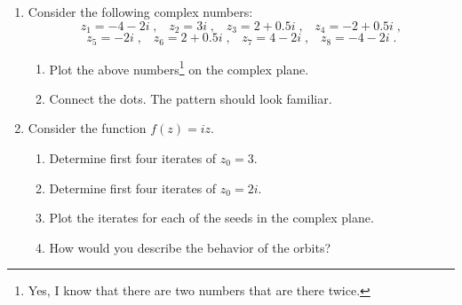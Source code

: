 \documentclass[12pt]{extarticle}
\begin{document}
\begin{enumerate}
\item Consider the following
  complex numbers:
  \begin{equation}
    z_1 = -4 -2i \;,\;\;\; z_2 = 3i \;,\;\;\; z_3 = 2 + 0.5i \;,
    \;\;\;   z_4 = -2 +0.5i \;,
  \end{equation}
  \begin{equation}
  z_5 = -2i \;,\;\;\; z_6 = 2 + 0.5i \;, \;\;\;    z_7 = 4 -2i
  \;,\;\;\; z_8 = -4 -2i \;.
  \end{equation}
    \begin{enumerate}
      \item Plot the above numbers\footnote{Yes, I know
        that there are two numbers that are there twice.} on the complex plane. 
      \item Connect the dots.  The pattern should look familiar.
    \end{enumerate}

  \item Consider the function $f(z) = iz$.
    \begin{enumerate}
      \setlength{\itemsep}{0mm}
    \item Determine first four iterates of $z_0 = 3$.
    \item Determine first four iterates of $z_0 = 2i$.
    \item Plot the iterates for each of the seeds in the complex
      plane.
    \item How would you describe the behavior of the orbits?\\
    \end{enumerate}
      
\end{enumerate}




\end{document}
